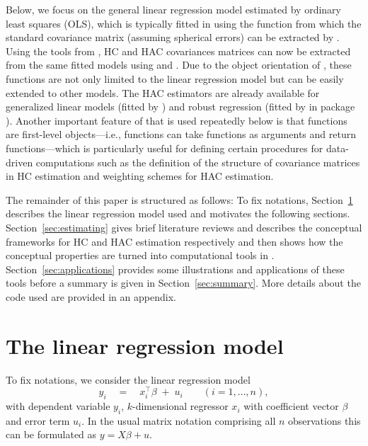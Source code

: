 \documentclass{Z}
\begin{document}
Below, we focus on the general linear regression model estimated by ordinary least squares (OLS), which is typically
fitted in  using the function  from which the standard covariance
matrix (assuming spherical errors) can be extracted by . Using the tools
from , HC and HAC covariances matrices can now be extracted from the same
fitted models using  and . Due to the object orientation of 
, these functions are not only limited to the linear regression model
but can be easily extended to other models. The HAC estimators are already available
for generalized linear models (fitted by ) and robust regression (fitted by
 in package ). Another important feature of  that is used repeatedly
below is that functions are first-level objects---i.e., functions can take functions as
arguments and return functions---which is particularly useful for defining certain
procedures for data-driven computations such as the definition of the structure of
covariance matrices in HC estimation and weighting schemes for HAC estimation.

The remainder of this paper is structured as follows: To fix notations, Section~\ref{sec:model}
describes the linear regression model used and motivates the
following sections. Section~\ref{sec:estimating} gives brief literature reviews and
describes the conceptual frameworks for HC and HAC estimation respectively and then
shows how the conceptual properties are turned into computational tools in .
Section~\ref{sec:applications} provides some illustrations and applications of these
tools before a summary is given in Section~\ref{sec:summary}.
More details about the  code used are provided in an appendix.


\section{The linear regression model} \label{sec:model}

To fix notations, we consider the linear regression model
\begin{equation} \label{eq:lm}
  y_i \quad = \quad x_i^\top \beta \; + \; u_i \qquad (i = 1, \dots, n),
\end{equation}
with dependent variable $y_i$, $k$-dimensional regressor
$x_i$ with coefficient vector $\beta$ and error term $u_i$.
In the usual matrix notation comprising all $n$ observations 
this can be formulated as $y = X \beta + u$.
\end{document}
